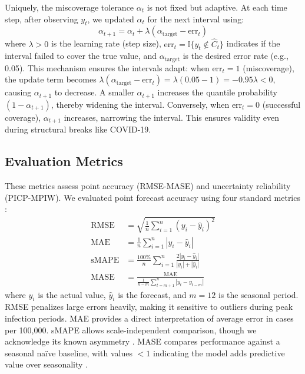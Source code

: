 \documentclass[final,3p,times,twocolumn,authoryear]{elsarticle}
\begin{document}
Uniquely, the miscoverage tolerance $\alpha_t$ is not fixed but adaptive. At each time step, after observing $y_t$, we updated $\alpha_t$ for the next interval using:
\begin{equation}
\label{eq:aci_update}
\alpha_{t+1} = \alpha_t + \lambda (\alpha_{\text{target}} - \text{err}_t)
\end{equation}
where $\lambda > 0$ is the learning rate (step size), $\text{err}_t = \mathbb{I}\{y_t \notin \hat{C}_t\}$ indicates if the interval failed to cover the true value, and $\alpha_{\text{target}}$ is the desired error rate (e.g., 0.05).
This mechanism ensures the intervals adapt: when $\text{err}_t = 1$ (miscoverage), the update term becomes $\lambda(\alpha_{\text{target}} - \text{err}_t) = \lambda(0.05 - 1) = -0.95\lambda < 0$, causing $\alpha_{t+1}$ to decrease. A smaller $\alpha_{t+1}$ increases the quantile probability $(1-\alpha_{t+1})$, thereby widening the interval. Conversely, when $\text{err}_t = 0$ (successful coverage), $\alpha_{t+1}$ increases, narrowing the interval. This ensures validity even during structural breaks like COVID-19.

\subsection{Evaluation Metrics}
These metrics assess point accuracy (RMSE-MASE) and uncertainty reliability (PICP-MPIW). We evaluated point forecast accuracy using four standard metrics \citep{hyndman2018forecasting}:
\begin{align}
\text{RMSE} &= \sqrt{\frac{1}{n}\sum_{i=1}^{n}(y_i - \hat{y}_i)^2} \\
\text{MAE} &= \frac{1}{n}\sum_{i=1}^{n}|y_i - \hat{y}_i| \\
\text{sMAPE} &= \frac{100\%}{n}\sum_{i=1}^{n}\frac{2|y_i - \hat{y}_i|}{|y_i| + |\hat{y}_i|} \\
\text{MASE} &= \frac{\text{MAE}}{\frac{1}{n-m}\sum_{t=m+1}^{n}|y_t - y_{t-m}|}
\end{align}
where $y_i$ is the actual value, $\hat{y}_i$ is the forecast, and $m=12$ is the seasonal period. RMSE penalizes large errors heavily, making it sensitive to outliers during peak infection periods. MAE provides a direct interpretation of average error in cases per 100,000. sMAPE allows scale-independent comparison, though we acknowledge its known asymmetry \citep{goodwin1999asymmetry}. MASE compares performance against a seasonal na\"ive baseline, with values $<1$ indicating the model adds predictive value over seasonality \citep{hyndman2006another}.
\end{document}
